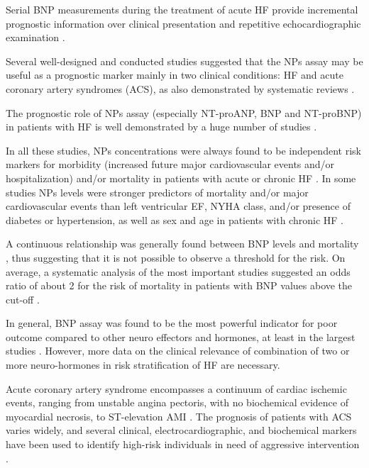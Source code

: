 \documentclass[14pt,a4paper,onecolumn]{extarticle}
\begin{document}
Serial BNP measurements during the treatment of acute HF provide incremental prognostic information over clinical presentation and repetitive echocardiographic examination \citep{bib3179}.

Several well-designed and conducted studies suggested that the NPs assay may be useful as a prognostic marker mainly in two clinical conditions: HF and acute coronary artery syndromes (ACS), as also demonstrated by systematic reviews \citep{bib35} \citep{bib376} \citep{bib3184} \citep{bib3185}.

The prognostic role of NPs assay (especially NT-proANP, BNP and NT-proBNP) in patients with HF is well demonstrated by a huge number of studies \citep{bib316} \citep{bib3147} \citep{bib3186} \citep{bib3187} \citep{bib3188} \citep{bib3189} \citep{bib3190} \citep{bib3191} \citep{bib3192} \citep{bib3193} \citep{bib3194} \citep{bib3195} \citep{bib3206} \citep{bib3197} \citep{bib3198} \citep{bib3199}.

In all these studies, NPs concentrations were always found to be independent risk markers for morbidity (increased future major cardiovascular events and/or hospitalization) and/or mortality in patients with acute or chronic HF \citep{bib35}. In some studies NPs levels were stronger predictors of mortality and/or major cardiovascular events than left ventricular EF, NYHA class, and/or presence of diabetes or hypertension, as well as sex and age in patients with chronic HF \citep{bib3188} \citep{bib3189} \citep{bib3192} \citep{bib3194} \citep{bib3195} \citep{bib3206} \citep{bib3198} \citep{bib3199}.

A continuous relationship was generally found between BNP levels and mortality \citep{bib3194}, thus suggesting that it is not possible to observe a threshold for the risk. On average, a systematic analysis of the most important studies suggested an odds ratio of about 2 for the risk of mortality in patients with BNP values above the cut-off \citep{bib35}.

In general, BNP assay was found to be the most powerful indicator for poor outcome compared to other neuro effectors and hormones, at least in the largest studies \citep{bib35} \citep{bib3204} \citep{bib3206}. However, more data on the clinical relevance of combination of two or more neuro-hormones in risk stratification of HF are necessary.

Acute coronary artery syndrome encompasses a continuum of cardiac ischemic events, ranging from unstable angina pectoris, with no biochemical evidence of myocardial necrosis, to ST-elevation AMI \citep{bib3221} \citep{bib3222}. The prognosis of patients with ACS varies widely, and several clinical, electrocardiographic, and biochemical markers have been used to identify high-risk individuals in need of aggressive intervention \citep{bib3222}.
\end{document}
